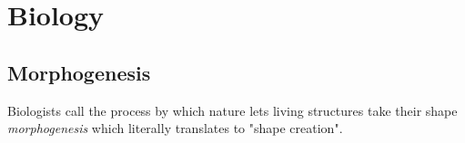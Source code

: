 \section{Biology}

\subsection{Morphogenesis}
Biologists call the process by which nature lets living structures take their shape \emph{morphogenesis} which literally translates to "shape creation". 





